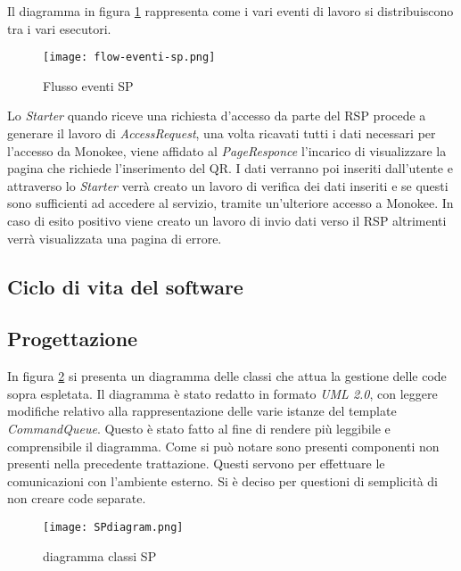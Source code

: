  Il diagramma in figura \ref{fig:eventdriven-flusso-code} rappresenta come i vari eventi di lavoro si distribuiscono tra i vari esecutori.

 \begin{figure}[htbp]
    \centering
    \texttt{[image: flow-eventi-sp.png]} 
    \caption{Flusso eventi SP}
    \label{fig:eventdriven-flusso-code} 
\end{figure}
Lo \emph{Starter} quando riceve una richiesta d’accesso da parte del RSP procede a generare il lavoro di \emph{AccessRequest}, una volta ricavati tutti i dati necessari per l’accesso da Monokee, viene affidato al \emph{PageResponce} l’incarico di visualizzare la pagina che richiede l’inserimento del QR. I dati verranno poi inseriti dall’utente e attraverso lo \emph{Starter} verrà creato un lavoro di verifica dei dati inseriti e se questi sono sufficienti ad accedere al servizio, tramite un’ulteriore accesso a Monokee. In caso di esito positivo viene creato un lavoro di invio dati verso il RSP altrimenti verrà visualizzata una pagina di errore.
\subsection{Ciclo di vita del software}
\label{sec:ciclo-vita-software}

\subsection{Progettazione}
\label{sec:progettazione}
In figura \ref{fig:sp-uml-diag} si presenta un diagramma delle classi che attua la gestione delle code sopra espletata. Il diagramma è stato redatto in formato \emph{UML 2.0}, con leggere modifiche relativo alla rappresentazione delle varie istanze del template \emph{CommandQueue}. Questo è stato fatto al fine di rendere più leggibile e comprensibile il diagramma. Come si può notare sono presenti componenti non presenti nella precedente trattazione. Questi servono per effettuare le comunicazioni con l’ambiente esterno. Si è deciso per questioni di semplicità di non creare code separate.

\begin{figure}[htbp]
    \centering
    \texttt{[image: SPdiagram.png]} 
    \caption{diagramma classi SP}
    \label{fig:sp-uml-diag} 
\end{figure}

